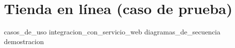 %
%
%

\section{Tienda en línea (caso de prueba)}

{casos_de_uso}
{integracion_con_servicio_web}
{diagramas_de_secuencia}
{demostracion}
